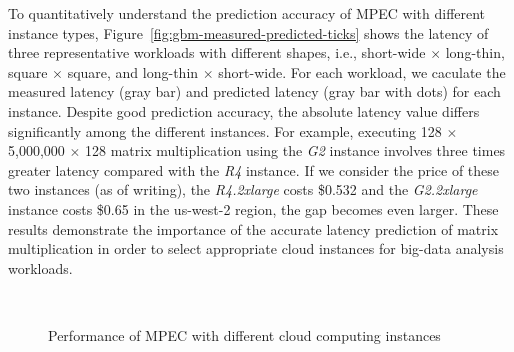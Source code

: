 \documentclass[10pt, conference, compsocconf]{IEEEtran}
\begin{document}
To quantitatively understand the prediction accuracy of MPEC with different instance types, Figure~\ref{fig:gbm-measured-predicted-ticks} shows the latency of three representative workloads with different shapes, i.e., short-wide $\times$ long-thin, square $\times$ square, and long-thin $\times$ short-wide. For each workload, we caculate the measured latency (gray bar) and predicted latency (gray bar with dots) for each instance. Despite good prediction accuracy, the absolute latency value differs significantly among the different instances. For example, executing 128 $\times$ 5,000,000 $\times$ 128 matrix multiplication using the \textit{G2} instance involves three times greater latency compared with the \textit{R4} instance. If we consider the price of these two instances (as of writing), the \textit{R4.2xlarge} costs \$0.532 and the \textit{G2.2xlarge} instance costs \$0.65 in the us-west-2 region, the gap becomes even larger. These results demonstrate the importance of the accurate latency prediction of matrix multiplication in order to select appropriate cloud instances for big-data analysis workloads.

\begin{figure}[t]
	\centering
	\\
	 \hfil
	\caption{\label{fig:gbm-comparison}Performance of MPEC with different cloud computing instances}
\end{figure}
\end{document}
